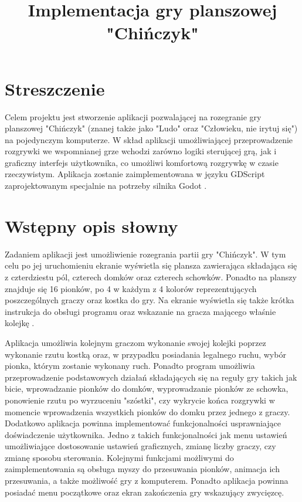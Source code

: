 \documentclass[conference]{IEEEtran}
\begin{document}
\title{Implementacja gry planszowej "Chińczyk"}

\author{
\and
{}
}

\maketitle


\section{Streszczenie}
Celem projektu jest stworzenie aplikacji pozwalającej na rozegranie gry planszowej "Chińczyk" (znanej także jako "Ludo" oraz "Człowieku, nie irytuj się") na pojedynczym komputerze. W skład aplikacji umożliwiającej przeprowadzenie rozgrywki we wspomnianej grze wchodzi zarówno logiki sterującej grą, jak i graficzny interfejs użytkownika, co umożliwi komfortową rozgrywkę w czasie rzeczywistym. Aplikacja zostanie zaimplementowana w języku GDScript zaprojektowanym specjalnie na potrzeby silnika Godot \cite{godot}.

\section{Wstępny opis słowny}
Zadaniem aplikacji jest umożliwienie rozegrania partii gry "Chińczyk". W tym celu po jej uruchomieniu ekranie wyświetla się plansza zawierająca składająca się z czterdziestu pól, czterech domków oraz czterech schowków. Ponadto na planszy znajduje się 16 pionków, po 4 w każdym z 4 kolorów reprezentujących poszczególnych graczy oraz kostka do gry. Na ekranie wyświetla się także krótka instrukcja do obsługi programu oraz wskazanie na gracza mającego właśnie kolejkę \cite{wiki}.\par
Aplikacja umożliwia kolejnym graczom wykonanie swojej kolejki poprzez wykonanie rzutu kostką oraz, w przypadku posiadania legalnego ruchu, wybór pionka, którym zostanie wykonany ruch.  Ponadto program umożliwia przeprowadzenie podstawowych działań składających się na reguły gry takich jak bicie, wprowadzanie pionków do domków, wyprowadzanie pionków ze schowka, ponowienie rzutu po wyrzuceniu "szóstki", czy wykrycie końca rozgrywki w momencie wprowadzenia wszystkich pionków do domku przez jednego z graczy. Dodatkowo aplikacja powinna implementować funkcjonalności usprawniające doświadczenie użytkownika. Jedno z takich funkcjonalności jak menu ustawień umożliwiające dostosowanie ustawień graficznych, zmianę liczby graczy, czy zmianę sposobu sterowania. Kolejnymi funkcjami możliwymi do zaimplementowania są obsługa myszy do przesuwania pionków, animacja ich przesuwania, a także możliwość gry z komputerem. Ponadto aplikacja powinna posiadać menu początkowe oraz ekran zakończenia gry wskazujący zwycięzcę.
\end{document}
